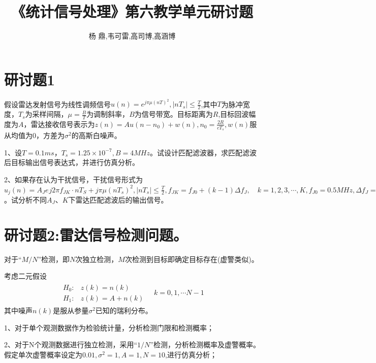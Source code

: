 \documentclass[fontset=windows]{article}
\title{\heiti\zihao{2} 《统计信号处理》第六教学单元研讨题}
\author{杨 鼎,韦可雷,高司博,高涵博}
\date{}
\numberwithin{figure}{section}
\begin{document}
\maketitle
\thispagestyle{empty}



\section{研讨题1}
假设雷达发射信号为线性调频信号\(u(n)=e^{j\pi \mu (nT)^2},|nT_s|\leqslant\frac{T}{2}\),其中\(T\)为脉冲宽度，\(T_s\)为采样间隔，\(\mu=\frac{B}{T}\)为调制斜率，\(B\)为信号带宽。目标距离为\(R\),目标回波幅度为\(A\)，雷达接收信号表示为\(z(n)=Au(n-n_0)+w(n),n_0=\frac{2R}{cT_s},w(n)\)服从均值为0，方差为\(\sigma^2\)的高斯白噪声。

1、设\(T=0.1ms，T_s=1.25\times 10^{-7},B=4MHz\)。试设计匹配滤波器，求匹配滤波后目标输出信号表达式，并进行仿真分析。

2、如果存在认为干扰信号，干扰信号形式为\(u_j(n)=A_Je^{}j2\pi f_{JK}\cdot nT_S+j\pi \mu(nT_s)^2,|nT_s|\leqslant\frac{T}{2},f_{JK}=f_{J0}+(k-1)\Delta f_J,\quad k=1,2,3,\cdots,K,f_{J0}=0.5MHz,\Delta f_J=0.4MHz\)。试分析不同\(A_J\)、\(K\)下雷达匹配滤波后的输出信号。

\newpage
\section{研讨题2:雷达信号检测问题。}

对于“\(M/N\)”检测，即\(N\)次独立检测，\(M\)次检测到目标即确定目标存在(虚警类似)。

考虑二元假设
\begin{align*}
    \begin{matrix}
        H_0: & z(k)=n(k)   \\
        H_1: & z(k)=A+n(k)
    \end{matrix}\quad k=0,1,\cdots N-1
\end{align*}
其中噪声\(n(k)\)是服从参量\(\sigma^2\)已知的瑞利分布。

1、对于单个观测数据作为检验统计量，分析检测门限和检测概率；

2、对于N个观测数据进行独立检测，采用“\(1/N\)”检测，分析检测概率及虚警概率。假定单次虚警概率设定为\(0.01,\sigma^2=1,A=1,N=10\),进行仿真分析；
\end{document}
